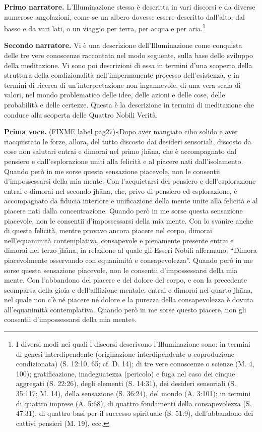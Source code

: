 \textbf{Primo narratore.} L’Illuminazione stessa è descritta in vari discorsi e
da diverse numerose angolazioni, come se un albero dovesse essere
descritto dall’alto, dal basso e da vari lati, o un viaggio per terra,
per acqua e per aria.\footnote{I diversi modi nei quali i discorsi descrivono l’Illuminazione sono: in termini di genesi interdipendente (originazione interdipendente o coproduzione condizionata) (S. 12:10, 65; cf. D. 14); di tre vere conoscenze o scienze (M. 4, 100); gratificazione, inadeguatezza (pericolo) e fuga nel caso dei cinque aggregati (S. 22:26), degli elementi (S. 14:31), dei desideri sensoriali (S. 35:117; M. 14), della sensazione (S. 36:24), del mondo (A. 3:101); in termini di quattro imprese (A. 5:68), di quattro fondamenti della consapevolezza (S. 47:31), di quattro basi per il successo spirituale (S. 51:9), dell’abbandono dei cattivi pensieri (M. 19), ecc.}


\textbf{Secondo narratore.} Vi è una descrizione dell’Illuminazione come
conquista delle tre vere conoscenze raccontata nel modo seguente, sulla
base dello sviluppo della meditazione. Vi sono poi descrizioni di essa
in termini d’una scoperta della struttura della condizionalità
nell’impermanente processo dell’esistenza, e in termini di ricerca di
un’interpretazione non ingannevole, di una vera scala di valori, nel
mondo problematico delle idee, delle azioni e delle cose, delle
probabilità e delle certezze. Questa è la descrizione in termini di
meditazione che conduce alla scoperta delle Quattro Nobili Verità.


\textbf{Prima voce.} (FIXME label pag27)«Dopo aver mangiato cibo solido e aver riacquistato le
forze, allora, del tutto discosto dai desideri sensoriali, discosto da
cose non salutari entrai e dimorai nel primo jhāna, che è accompagnato
dal pensiero e dall’esplorazione uniti alla felicità e al piacere nati
dall’isolamento. Quando però in me sorse questa sensazione piacevole,
non le consentii d’impossessarsi della mia mente. Con l’acquietarsi del
pensiero e dell’esplorazione entrai e dimorai nel secondo jhāna, che,
privo di pensiero ed esplorazione, è accompagnato da fiducia interiore e
unificazione della mente unite alla felicità e al piacere nati dalla
concentrazione. Quando però in me sorse questa sensazione piacevole, non
le consentii d’impossessarsi della mia mente. Con lo svanire anche di
questa felicità, mentre provavo ancora piacere nel corpo, dimorai
nell’equanimità contemplativa, consapevole e pienamente presente entrai
e dimorai nel terzo jhāna, in relazione al quale gli Esseri Nobili
affermano: “Dimora piacevolmente osservando con equanimità e
consapevolezza”. Quando però in me sorse questa sensazione piacevole,
non le consentii d’impossessarsi della mia mente. Con l’abbandono del
piacere e del dolore del corpo, e con la precedente scomparsa della
gioia e dell’afflizione mentale, entrai e dimorai nel quarto jhāna, nel
quale non c’è né piacere né dolore e la purezza della consapevolezza è
dovuta all’equanimità contemplativa. Quando però in me sorse questo
piacere, non gli consentii d’impossessarsi della mia mente».


